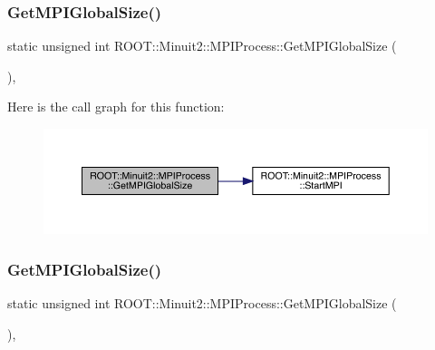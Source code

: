 \subsubsection{\texorpdfstring{GetMPIGlobalSize()}{GetMPIGlobalSize()}\hspace{0.1cm}{\footnotesize\ttfamily [2/3]}}
{\footnotesize\ttfamily static unsigned int R\+O\+O\+T\+::\+Minuit2\+::\+M\+P\+I\+Process\+::\+Get\+M\+P\+I\+Global\+Size (\begin{DoxyParamCaption}{ }\end{DoxyParamCaption})\hspace{0.3cm}{\ttfamily [inline]}, {\ttfamily [static]}}

Here is the call graph for this function\+:
\nopagebreak
\begin{figure}[H]
\begin{center}
\leavevmode
\includegraphics[width=350pt]{dc/d43/classROOT_1_1Minuit2_1_1MPIProcess_acfa3106122ad8f8c7d6bb3777c3d1ccc_cgraph}
\end{center}
\end{figure}
\mbox{\label{classROOT_1_1Minuit2_1_1MPIProcess_acfa3106122ad8f8c7d6bb3777c3d1ccc}} 
\subsubsection{\texorpdfstring{GetMPIGlobalSize()}{GetMPIGlobalSize()}\hspace{0.1cm}{\footnotesize\ttfamily [3/3]}}
{\footnotesize\ttfamily static unsigned int R\+O\+O\+T\+::\+Minuit2\+::\+M\+P\+I\+Process\+::\+Get\+M\+P\+I\+Global\+Size (\begin{DoxyParamCaption}{ }\end{DoxyParamCaption})\hspace{0.3cm}{\ttfamily [inline]}, {\ttfamily [static]}}

